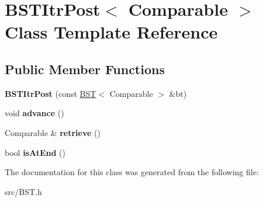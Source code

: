 \hypertarget{singleton_b_s_t_itr_post}{\section{B\+S\+T\+Itr\+Post$<$ Comparable $>$ Class Template Reference}
\label{singleton_b_s_t_itr_post}
}
\subsection*{Public Member Functions}
\begin{DoxyCompactItemize}
\item 
\hypertarget{singleton_b_s_t_itr_post_acf7e537dea01978f40c40909c55c56c2}{{\bfseries B\+S\+T\+Itr\+Post} (const \hyperlink{singleton_b_s_t}{B\+S\+T}$<$ Comparable $>$ \&bt)}\label{singleton_b_s_t_itr_post_acf7e537dea01978f40c40909c55c56c2}

\item 
\hypertarget{singleton_b_s_t_itr_post_a376098e5a82cd02118dd4dcdec49bb26}{void {\bfseries advance} ()}\label{singleton_b_s_t_itr_post_a376098e5a82cd02118dd4dcdec49bb26}

\item 
\hypertarget{singleton_b_s_t_itr_post_a72446e4d0df0bcafc14294a78faeb56e}{Comparable \& {\bfseries retrieve} ()}\label{singleton_b_s_t_itr_post_a72446e4d0df0bcafc14294a78faeb56e}

\item 
\hypertarget{singleton_b_s_t_itr_post_a2f330e73bb817e8bd1c797805e66ddb7}{bool {\bfseries is\+At\+End} ()}\label{singleton_b_s_t_itr_post_a2f330e73bb817e8bd1c797805e66ddb7}

\end{DoxyCompactItemize}


The documentation for this class was generated from the following file\+:\begin{DoxyCompactItemize}
\item 
src/B\+S\+T.\+h\end{DoxyCompactItemize}
